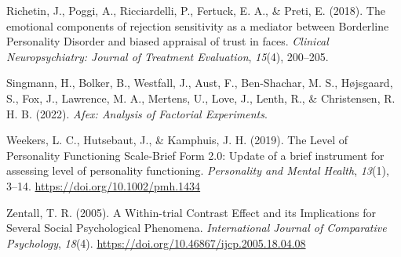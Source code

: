 \documentclass[
]{article}
\newlength{\cslhangindent}
\newenvironment{CSLReferences}[2] %
 {\begin{list}{}{%
  \setlength{\itemindent}{0pt}
  \setlength{\leftmargin}{0pt}
  \setlength{\parsep}{0pt}
  \ifodd #1
   \setlength{\leftmargin}{\cslhangindent}
   \setlength{\itemindent}{-1\cslhangindent}
  \fi
  \setlength{\itemsep}{#2\baselineskip}}}
 {\end{list}}
\begin{document}
\begin{CSLReferences}{1}{0}
Richetin, J., Poggi, A., Ricciardelli, P., Fertuck, E. A., \& Preti, E. (2018). The emotional components of rejection sensitivity as a mediator between {Borderline Personality Disorder} and biased appraisal of trust in faces. \emph{Clinical Neuropsychiatry: Journal of Treatment Evaluation}, \emph{15}(4), 200--205.

Singmann, H., Bolker, B., Westfall, J., Aust, F., Ben-Shachar, M. S., Højsgaard, S., Fox, J., Lawrence, M. A., Mertens, U., Love, J., Lenth, R., \& Christensen, R. H. B. (2022). \emph{Afex: {Analysis} of {Factorial Experiments}}.

Weekers, L. C., Hutsebaut, J., \& Kamphuis, J. H. (2019). The {Level} of {Personality Functioning Scale}-{Brief Form} 2.0: {Update} of a brief instrument for assessing level of personality functioning. \emph{Personality and Mental Health}, \emph{13}(1), 3--14. \url{https://doi.org/10.1002/pmh.1434}

Zentall, T. R. (2005). A {Within-trial Contrast Effect} and its {Implications} for {Several Social Psychological Phenomena}. \emph{International Journal of Comparative Psychology}, \emph{18}(4). \url{https://doi.org/10.46867/ijcp.2005.18.04.08}

\end{CSLReferences}
\end{document}

